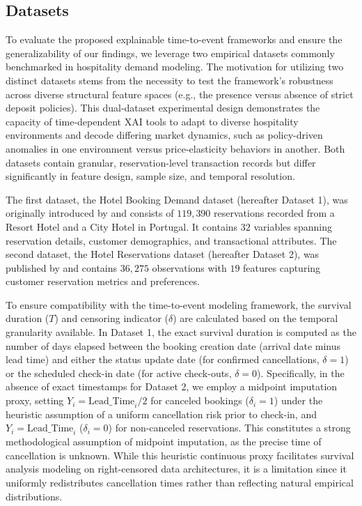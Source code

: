 \documentclass[pdflatex,sn-mathphys-ay]{sn-jnl}
\theoremstyle{thmstyleone}%
\theoremstyle{thmstyletwo}%
\theoremstyle{thmstylethree}%
\begin{document}
\subsection{Datasets}

To evaluate the proposed explainable time-to-event frameworks and ensure the generalizability of our findings, we leverage two empirical datasets commonly benchmarked in hospitality demand modeling. The motivation for utilizing two distinct datasets stems from the necessity to test the framework's robustness across diverse structural feature spaces (e.g., the presence versus absence of strict deposit policies). This dual-dataset experimental design demonstrates the capacity of time-dependent XAI tools to adapt to diverse hospitality environments and decode differing market dynamics, such as policy-driven anomalies in one environment versus price-elasticity behaviors in another. Both datasets contain granular, reservation-level transaction records but differ significantly in feature design, sample size, and temporal resolution.

The first dataset, the Hotel Booking Demand dataset (hereafter Dataset 1), was originally introduced by \cite{antonio2019data} and consists of $119,390$ reservations recorded from a Resort Hotel and a City Hotel in Portugal. It contains $32$ variables spanning reservation details, customer demographics, and transactional attributes. The second dataset, the Hotel Reservations dataset (hereafter Dataset 2), was published by \cite{raza2023hotel} and contains $36,275$ observations with $19$ features capturing customer reservation metrics and preferences.

To ensure compatibility with the time-to-event modeling framework, the survival duration ($T$) and censoring indicator ($\delta$) are calculated based on the temporal granularity available. In Dataset 1, the exact survival duration is computed as the number of days elapsed between the booking creation date (arrival date minus lead time) and either the status update date (for confirmed cancellations, $\delta = 1$) or the scheduled check-in date (for active check-outs, $\delta = 0$). Specifically, in the absence of exact timestamps for Dataset 2, we employ a midpoint imputation proxy, setting $Y_i = \text{Lead\_Time}_i / 2$ for canceled bookings ($\delta_i = 1$) under the heuristic assumption of a uniform cancellation risk prior to check-in, and $Y_i = \text{Lead\_Time}_i$ ($\delta_i = 0$) for non-canceled reservations. This constitutes a strong methodological assumption of midpoint imputation, as the precise time of cancellation is unknown. While this heuristic continuous proxy facilitates survival analysis modeling on right-censored data architectures, it is a limitation since it uniformly redistributes cancellation times rather than reflecting natural empirical distributions.
\end{document}
